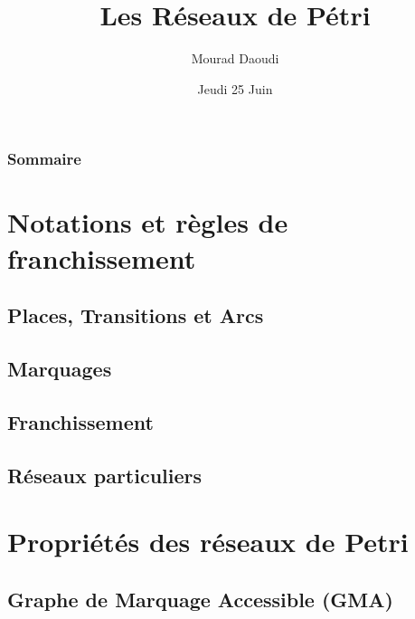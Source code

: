 \documentclass[11pt]{beamer}
\author{Mourad Daoudi}
\title{Les Réseaux de Pétri}
\institute{USTHB}
\date{Jeudi 25 Juin}
\begin{document}
	\maketitle
	\begin{frame}[shrink=15]
		\frametitle{Sommaire}
		\tableofcontents{}
	\end{frame}

	
	\section{Notations et règles de franchissement}
		\begin{frame}
	\frametitle{}
	\end{frame}
	\subsection{ Places, Transitions et Arcs       }
		\begin{frame}
	\frametitle{}
	\end{frame}
	\subsection{ Marquages                }
		\begin{frame}
	\frametitle{}
	\end{frame}
	\subsection{ Franchissement             }
		\begin{frame}
	\frametitle{}
	\end{frame}
	\subsection{ Réseaux particuliers          }
		\begin{frame}
	\frametitle{}
	\end{frame}
	\section{Propriétés des réseaux de Petri}
		\begin{frame}
	\frametitle{}
	\end{frame}
	\subsection{ Graphe de Marquage Accessible (GMA)            }
		\begin{frame}
	\frametitle{}
	\end{frame}
\end{document}
